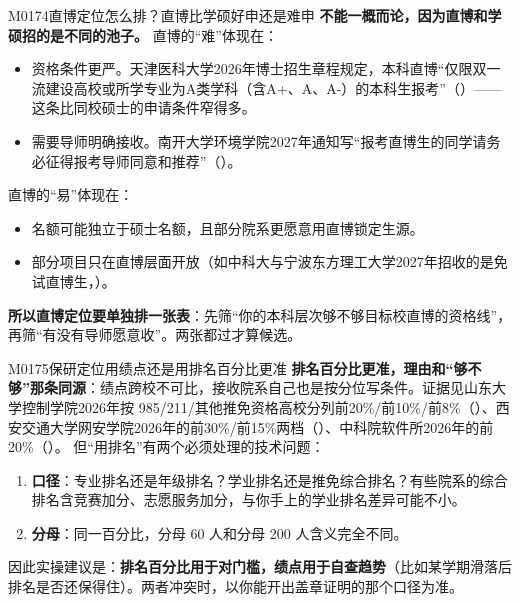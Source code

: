 \begin{qa}{M0174}{直博定位怎么排？直博比学硕好申还是难申}
\textbf{不能一概而论，因为直博和学硕招的是不同的池子。}
直博的“难”体现在：
\begin{itemize}
  \item 资格条件更严。天津医科大学2026年博士招生章程规定，本科直博“仅限双一流建设高校或所学专业为A类学科（含A+、A、A-）的本科生报考”（）——这条比同校硕士的申请条件窄得多。
  \item 需要导师明确接收。南开大学环境学院2027年通知写“报考直博生的同学请务必征得报考导师同意和推荐”（）。
\end{itemize}
直博的“易”体现在：
\begin{itemize}
  \item 名额可能独立于硕士名额，且部分院系更愿意用直博锁定生源。
  \item 部分项目只在直博层面开放（如中科大与宁波东方理工大学2027年招收的是免试直博生，）。
\end{itemize}
\textbf{所以直博定位要单独排一张表}：先筛“你的本科层次够不够目标校直博的资格线”，再筛“有没有导师愿意收”。两张都过才算候选。
\end{qa}

\begin{qa}{M0175}{保研定位用绩点还是用排名百分比更准}
\textbf{排名百分比更准，理由和“够不够”那条同源}：绩点跨校不可比，接收院系自己也是按分位写条件。证据见山东大学控制学院2026年按 985/211/其他推免资格高校分列前20\%/前10\%/前8\%（）、西安交通大学网安学院2026年的前30\%/前15\%两档（）、中科院软件所2026年的前20\%（）。
但“用排名”有两个必须处理的技术问题：
\begin{enumerate}
  \item \textbf{口径}：专业排名还是年级排名？学业排名还是推免综合排名？有些院系的综合排名含竞赛加分、志愿服务加分，与你手上的学业排名差异可能不小。
  \item \textbf{分母}：同一百分比，分母 60 人和分母 200 人含义完全不同。
\end{enumerate}
因此实操建议是：\textbf{排名百分比用于对门槛，绩点用于自查趋势}（比如某学期滑落后排名是否还保得住）。两者冲突时，以你能开出盖章证明的那个口径为准。
\end{qa}

